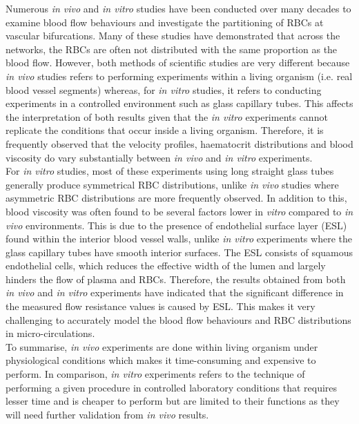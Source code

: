 \noindent Numerous \textit{in vivo} and \textit{in vitro} studies\cite{LIPOWSKY1980297, PRIES198981, CARR1990179, PriesAR1990BFiM, PriesAR1994RtBF, SmithMichaelL2003Nmra, Sherwood2014, Roman2016, Mantegazza2020} have been conducted over many decades to examine blood flow behaviours and investigate the partitioning of RBCs at vascular bifurcations. Many of these studies have demonstrated that across the networks, the RBCs are often not distributed with the same proportion as the blood flow. However, both methods of scientific studies are very different because \textit{in vivo} studies refers to performing experiments within a living organism (i.e. real blood vessel segments) whereas, for \textit{in vitro} studies, it refers to conducting experiments in a controlled environment such as glass capillary tubes. This affects the interpretation of both results given that the \textit{in vitro} experiments cannot replicate the conditions that occur inside a living organism. Therefore, it is frequently observed that the velocity profiles, haematocrit distributions and blood viscosity do vary substantially between \textit{in vivo} and \textit{in vitro} experiments. \\

\noindent For \textit{in vitro} studies, most of these experiments using long straight glass tubes generally produce symmetrical RBC distributions, unlike \textit{in vivo} studies where asymmetric RBC distributions are more frequently observed.\cite{Sherwood2014} In addition to this, blood viscosity was often found to be several factors lower in \textit{vitro} compared to \textit{in vivo} environments.\cite{Pries2000TheLayer, A.R.Pries2005Mbvi} This is due to the presence of endothelial surface layer (ESL) found within the interior blood vessel walls, unlike \textit{in vitro} experiments where the glass capillary tubes have smooth interior surfaces. The ESL consists of squamous endothelial cells, which reduces the effective width of the lumen and largely hinders the flow of plasma and RBCs.\cite{Pries2000TheLayer, WeinbaumSheldon2007Tsaf} Therefore, the results obtained from both \textit{in vivo} and \textit{in vitro} experiments have indicated that the significant difference in the measured flow resistance values is caused by ESL. This makes it very challenging to accurately model the blood flow behaviours and RBC distributions in micro-circulations. \\

\noindent To summarise, \textit{in vivo} experiments are done within living organism under physiological conditions which makes it time-consuming and expensive to perform. In comparison, \textit{in vitro} experiments refers to the technique of performing a given procedure in controlled laboratory conditions that requires lesser time and is cheaper to perform but are limited to their functions as they will need further validation from \textit{in vivo} results. 